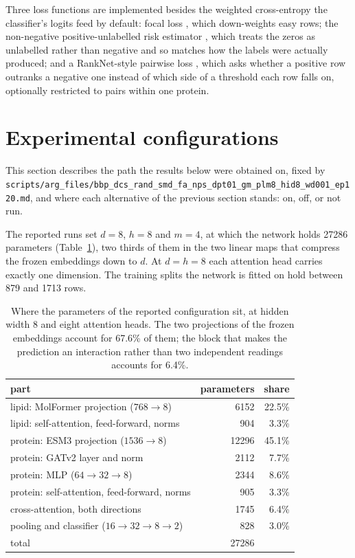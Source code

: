 Three loss functions are implemented besides the weighted cross-entropy the classifier's
logits feed by default: focal loss \cite{focal}, which down-weights easy rows; the
non-negative positive-unlabelled risk estimator \cite{nnpu}, which treats the zeros as
unlabelled rather than negative and so matches how the labels were actually produced; and
a RankNet-style pairwise loss \cite{ranknet}, which asks whether a positive row outranks a
negative one instead of which side of a threshold each row falls on, optionally
restricted to pairs within one protein.

\section{Experimental configurations}
\label{sec:expconfig}

This section describes the path the results below were obtained on, fixed by
\texttt{scripts/arg\_files/bbp\_dcs\_rand\_smd\_fa\_nps\_dpt01\_gm\_plm8\_hid8\_wd001\_ep120.md},
and where each alternative of the previous section stands: on, off, or not run.

The reported runs set $d = 8$, $h = 8$ and $m = 4$, at which the network holds 27286
parameters (Table~\ref{tab:params}), two thirds of them in the two linear maps that
compress the frozen embeddings down to $d$. At $d = h = 8$ each attention head carries
exactly one dimension. The training splits the network is fitted on hold between 879 and
1713 rows.

\begin{table}[htbp]
\centering
\begin{tabular}{lrr}
\hline
part & parameters & share \\
\hline
lipid: MolFormer projection ($768 \to 8$) & 6152 & 22.5\% \\
lipid: self-attention, feed-forward, norms & 904 & 3.3\% \\
protein: ESM3 projection ($1536 \to 8$) & 12296 & 45.1\% \\
protein: GATv2 layer and norm & 2112 & 7.7\% \\
protein: MLP ($64 \to 32 \to 8$) & 2344 & 8.6\% \\
protein: self-attention, feed-forward, norms & 905 & 3.3\% \\
cross-attention, both directions & 1745 & 6.4\% \\
pooling and classifier ($16 \to 32 \to 8 \to 2$) & 828 & 3.0\% \\
\hline 
total & 27286 & \\
\hline
\end{tabular}
\caption{Where the parameters of the reported configuration sit, at hidden width 8 and
eight attention heads. The two projections of the frozen embeddings account for 67.6\%
of them; the block that makes the prediction an interaction rather than two independent
readings accounts for 6.4\%.}
\label{tab:params}
\end{table}

